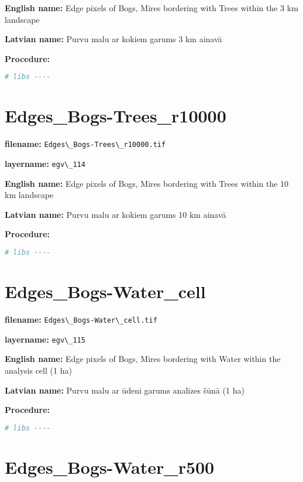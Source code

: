 \documentclass[
]{book}
\newcommand{\passthrough}[1]{#1}
\begin{document}
\textbf{English name:} Edge pixels of Bogs, Mires bordering with Trees within the 3 km landscape

\textbf{Latvian name:} Purvu malu ar kokiem garums 3 km ainavā

\textbf{Procedure:}

\begin{lstlisting}[language=R]
# libs ----
\end{lstlisting}

\section{Edges\_Bogs-Trees\_r10000}\label{ch06.114}

\textbf{filename:} \passthrough{\lstinline!Edges\_Bogs-Trees\_r10000.tif!}

\textbf{layername:} \passthrough{\lstinline!egv\_114!}

\textbf{English name:} Edge pixels of Bogs, Mires bordering with Trees within the 10 km landscape

\textbf{Latvian name:} Purvu malu ar kokiem garums 10 km ainavā

\textbf{Procedure:}

\begin{lstlisting}[language=R]
# libs ----
\end{lstlisting}

\section{Edges\_Bogs-Water\_cell}\label{ch06.115}

\textbf{filename:} \passthrough{\lstinline!Edges\_Bogs-Water\_cell.tif!}

\textbf{layername:} \passthrough{\lstinline!egv\_115!}

\textbf{English name:} Edge pixels of Bogs, Mires bordering with Water within the analysis cell (1 ha)

\textbf{Latvian name:} Purvu malu ar ūdeni garums analīzes šūnā (1 ha)

\textbf{Procedure:}

\begin{lstlisting}[language=R]
# libs ----
\end{lstlisting}

\section{Edges\_Bogs-Water\_r500}\label{ch06.116}
\end{document}
